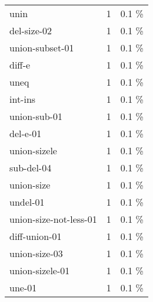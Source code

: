 \documentclass[a4paper]{article}
\begin{document}
\begin{supertabular}{l|r|r}
unin & 1 & 0.1 \% \\
del-size-02 & 1 & 0.1 \% \\
union-subset-01 & 1 & 0.1 \% \\
diff-e & 1 & 0.1 \% \\
uneq & 1 & 0.1 \% \\
int-ins & 1 & 0.1 \% \\
union-sub-01 & 1 & 0.1 \% \\
del-e-01 & 1 & 0.1 \% \\
union-sizele & 1 & 0.1 \% \\
sub-del-04 & 1 & 0.1 \% \\
union-size & 1 & 0.1 \% \\
undel-01 & 1 & 0.1 \% \\
union-size-not-less-01 & 1 & 0.1 \% \\
diff-union-01 & 1 & 0.1 \% \\
union-size-03 & 1 & 0.1 \% \\
union-sizele-01 & 1 & 0.1 \% \\
une-01 & 1 & 0.1 \% \\

\end{supertabular}
\end{document}
